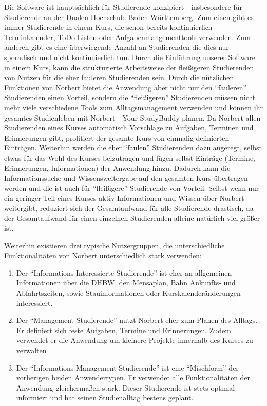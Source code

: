 Die Software ist hauptsächlich für Studierende konzipiert - insbesondere für Studierende an der Dualen Hochschule Baden Württemberg. Zum einen gibt es immer Studierende in einem Kurs, die schon bereits kontinuierlich Terminkalender, ToDo-Listen oder Aufgabenmangementtools verwenden. Zum anderen gibt es eine überwiegende Anzahl an Studierenden die dies nur sporadisch und nicht kontinuierlich tun. Durch die Einführung unserer Software in einem Kurs, kann die strukturierte Arbeitsweise der fleißigeren Studierenden von Nutzen für die eher fauleren Studierenden sein. Durch die nützlichen Funktionen von Norbert bietet die Anwendung aber nicht nur den \enquote{fauleren} Studierenden einen Vorteil, sondern die \enquote{fleißigeren} Studierenden müssen nicht mehr viele verschiedene Tools zum Alltagsmanagement verwenden und können ihr gesamtes Studienleben mit Norbert - Your StudyBuddy planen. Da Norbert allen Studierenden eines Kurses automatisch Vorschläge zu Aufgaben, Terminen und Erinnerungen gibt, profitiert der gesamte Kurs von einmalig definierten Einträgen. Weiterhin werden die eher \enquote{faulen} Studierenden dazu angeregt, selbst etwas für das Wohl des Kurses beizutragen und fügen selbst Einträge (Termine, Erinnerungen, Informationen) der Anwendung hinzu. Dadurch kann die Informationssuche und Wissensweitergabe auf den gesamten Kurs übertragen werden und die ist auch für \enquote{fleißigere} Studierende von Vorteil. Selbst wenn nur ein geringer Teil eines Kurses aktiv Informationen und Wissen über Norbert weitergibt, reduziert sich der Gesamtaufwand für alle Studierende drastisch, da der Gesamtaufwand für einen einzelnen Studierenden alleine natürlich viel größer ist.

Weiterhin existieren drei typische Nutzergruppen, die unterschiedliche Funktionalitäten von Norbert unterschiedlich stark verwenden:

\begin{enumerate}
	\item Der \enquote{Informations-Interessierte-Studierende} ist eher an allgemeinen Informationen über die DHBW, den Mensaplan, Bahn Ankunfts- und Abfahrtszeiten, sowie Stauinformationen oder Kurskalenderänderungen interessiert.
	
	\item Der \enquote{Management-Studierende} nutzt Norbert eher zum Planen des Alltags. Er definiert sich feste Aufgaben, Termine und Erinnerungen. Zudem verwendet er die Anwendung um kleinere Projekte innerhalb des Kurses zu verwalten
	
	\item Der \enquote{Informations-Management-Studierende} ist eine \enquote{Mischform} der vorherigen beiden Anwendertypen. Er verwendet alle Funktionalitäten der Anwendung gleichermaßen stark. Dieser Studierende ist stets optimal informiert und hat seinen Studienalltag bestens geplant. 
\end{enumerate}

